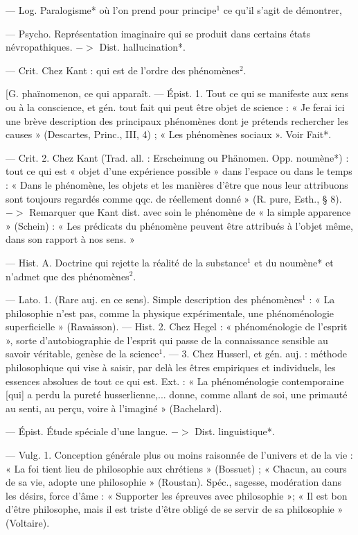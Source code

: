 \begin{itemize}[leftmargin=1cm, label=, itemsep=1pt]
 — Log. Paralogisme* où l’on prend pour principe$^1$
ce qu'il s’agit de démontrer,

 — Psycho. Représentation imaginaire qui se produit dans
certains états névropathiques.
$->$ Dist. hallucination*.

 — Crit. Chez Kant : qui
est de l’ordre des phénomènes$^2$.

 [G. phaïnomenon, ce qui
apparaît. — Épist. 1. Tout ce qui
se manifeste aux sens ou à la conscience, et gén. tout fait qui peut
être objet de science : « Je ferai ici
une brève description des principaux
phénomènes dont je prétends rechercher les causes » (Descartes, Princ.,
III, 4) ; « Les phénomènes sociaux ».
Voir Fait*.

— Crit. 2. Chez Kant (Trad. all. :
Erscheinung ou Phänomen. Opp.
noumène*) : tout ce qui est « objet
d'une expérience possible » dans
l’espace ou dans le temps : « Dans
le phénomène, les objets et les manières d'être que nous leur attribuons sont toujours regardés comme
qqc. de réellement donné » (R. pure,
Esth., § 8). $->$ Remarquer que
Kant dist. avec soin le phénomène
de « la simple apparence » (Schein) :
« Les prédicats du phénomène peuvent être attribués à l’objet même,
dans son rapport à nos sens. »

 — Hist. A. Doctrine
qui rejette la réalité de la substance$^1$
et du noumène* et n’admet que des
phénomènes$^2$.

 — Lato. 1. (Rare
auj. en ce sens). Simple description
des phénomènes$^1$ : « La philosophie
n’est pas, comme la physique expérimentale,
une phénoménologie superficielle » (Ravaisson). — Hist.
2. Chez Hegel : « phénoménologie de
l'esprit », sorte d’autobiographie de
l'esprit qui passe de la connaissance
sensible au savoir véritable, genèse
de la science$^1$. — 3. Chez Husserl, et
gén. auj. : méthode philosophique
qui vise à saisir, par delà les êtres
empiriques et individuels, les
essences absolues de tout ce qui est.
Ext. : « La phénoménologie contemporaine [qui] a perdu la pureté husserlienne,... donne, comme allant de
soi, une primauté au senti, au perçu,
voire à l’imaginé » (Bachelard).

 — Épist. Étude spéciale d’une
langue. $->$ Dist. linguistique*.

 — Vulg. 1. Conception
générale plus ou moins raisonnée de
l’univers et de la vie : « La foi tient
lieu de philosophie aux chrétiens »
(Bossuet) ; « Chacun, au cours de sa
vie, adopte une philosophie » (Roustan). Spéc., sagesse, modération
dans les désirs, force d'âme : « Supporter les épreuves avec philosophie »; « Il est bon d’être philosophe,
mais il est triste d’être obligé de se
servir de sa philosophie » (Voltaire).


\end{itemize}
